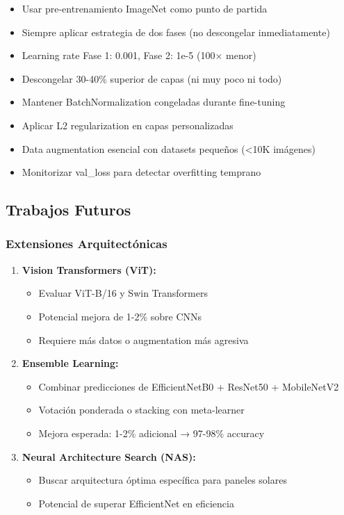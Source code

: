 \documentclass[11pt, a4paper]{article}
\begin{document}
\begin{itemize}
    \item Usar pre-entrenamiento ImageNet como punto de partida
    \item Siempre aplicar estrategia de dos fases (no descongelar inmediatamente)
    \item Learning rate Fase 1: 0.001, Fase 2: 1e-5 (100× menor)
    \item Descongelar 30-40\% superior de capas (ni muy poco ni todo)
    \item Mantener BatchNormalization congeladas durante fine-tuning
    \item Aplicar L2 regularization en capas personalizadas
    \item Data augmentation esencial con datasets pequeños (<10K imágenes)
    \item Monitorizar val\_loss para detectar overfitting temprano
\end{itemize}

\subsection{Trabajos Futuros}

\subsubsection{Extensiones Arquitectónicas}

\begin{enumerate}
    \item \textbf{Vision Transformers (ViT):}
    \begin{itemize}
        \item Evaluar ViT-B/16 y Swin Transformers
        \item Potencial mejora de 1-2\% sobre CNNs
        \item Requiere más datos o augmentation más agresiva
    \end{itemize}
    
    \item \textbf{Ensemble Learning:}
    \begin{itemize}
        \item Combinar predicciones de EfficientNetB0 + ResNet50 + MobileNetV2
        \item Votación ponderada o stacking con meta-learner
        \item Mejora esperada: 1-2\% adicional → 97-98\% accuracy
    \end{itemize}
    
    \item \textbf{Neural Architecture Search (NAS):}
    \begin{itemize}
        \item Buscar arquitectura óptima específica para paneles solares
        \item Potencial de superar EfficientNet en eficiencia
    \end{itemize}
\end{enumerate}
\end{document}
